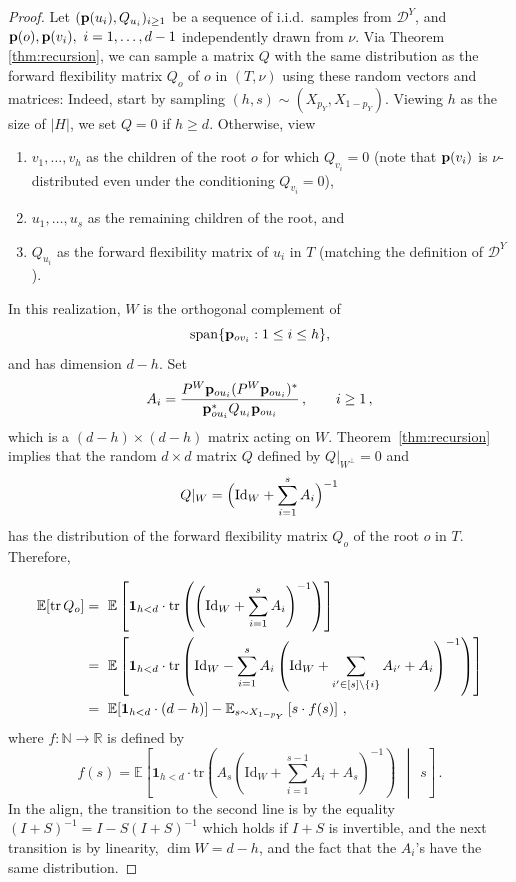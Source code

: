 \documentclass[reqno,english]{amsart}
\numberwithin{equation}{section}
\theoremstyle{definition}{
\newtheorem{example}[theorem]{Example}
\newtheorem{definition}[theorem]{Definition}
\newtheorem*{definition*}{Definition}
\newtheorem{problem}[theorem]{Problem}
\newtheorem{question}[theorem]{Question}
}
\newcommand{\E}{\mathbb E}
\newcommand{\N}{\mathbb N}
\newcommand{\R}{\mathbb R}
\newcommand{\cD}{\mathcal D}
\newcommand{\p}{{\bf p}}
\newcommand{\tr}{{\mathrm {tr}}}
\newcommand{\Id}{\mathrm{Id}}
\begin{document}
\begin{proof}
Let $(\p(u_i),Q_{u_i})_{i\ge 1}$ be a sequence of i.i.d.\ samples from $\cD^Y$, and $\p(o),\p(v_i),~i=1,\ldots,d-1$ independently drawn from $\nu$. Via Theorem \ref{thm:recursion}, we can sample a matrix $Q$ with the same distribution as the forward flexibility matrix $Q_o$ of $o$ in $(T,\nu)$
 using these random vectors and matrices: 
Indeed, start by sampling \((h,s)\sim (X_{p_Y},X_{1-p_Y})\).
Viewing \(h\) as the size of \(|H|\), we set \(Q=0\) if \(h\ge d\).
Otherwise, view
\begin{enumerate}
    \item[(i)] \(v_1,\ldots,v_h\) as the children of the root \(o\)
    for which \(Q_{v_i}=0\) (note that \(\p(v_i)\) is
    \(\nu\)-distributed even under the conditioning \(Q_{v_i}=0\)),
    \item[(ii)] \(u_1,\ldots,u_s\) as the remaining children of the root,
    and
    \item[(iii)] \(Q_{u_i}\) as the forward flexibility matrix of \(u_i\)
    in \(T\) (matching the definition of \(\cD^Y\)).
\end{enumerate}



In this realization, $W$ is the orthogonal complement of
\[
\mathrm{span}\{\p_{ov_i}: 1\le i\le h\},
\]
and has dimension $d-h$. Set 
\[
A_i=\frac{P^W\p_{ou_i}(P^W\p_{ou_i})^*}{\p_{ou_i}^*Q_{u_i}\p_{ou_i}}\,,\qquad i\ge 1\,,
\]
which is a $(d-h)\times(d-h)$ matrix acting on $W$. Theorem~\ref{thm:recursion} implies that the random $d\times d$ matrix $Q$ defined by $Q|_{W^\perp}=0$ and
\[
Q|_W=\Bigl(\Id_W+\sum_{i=1}^{s}A_i\Bigr)^{-1}
\]
has the distribution of the forward flexibility matrix $Q_o$ of the root $o$ in $T$.
Therefore,

\begin{align}
\notag 
\E[\tr\,Q_o] 
&=~ \E\left[ \mathbf 1_{h<d}\cdot \tr\left(\left(\Id_W + \sum_{i=1}^{s}A_i\right)^{-1}\right)\right] \\
\notag &=~ \E\left[\mathbf 1_{h<d}\cdot \tr\left(
\Id_W-\sum_{i=1}^{s}A_i \left(\Id_W + \sum_{i'\in[s]\setminus\{i\}}A_{i'} +A_i\right)^{-1}\right)\right] \\
\label{eq:first_stop} &=~ \E[\mathbf 1_{h<d}\cdot (d-h)] - \E_{s\sim X_{1-p_Y}}\left[ s\cdot f(s) \right]\,,
\end{align}
where $f:\N\to \R$ is defined by
\[
f(s) = 
\E\left[\mathbf{1}_{h<d}\cdot 
\tr\left(A_s \left(\Id_W + \sum_{i=1}^{s-1}A_i+A_s\right)^{-1}\right)
~~\middle |~~s\right]\,.
\]
In the align, the transition to the second line is by the equality $(I+S)^{-1}=I-S(I+S)^{-1}$ which holds if $I+S$ is invertible, and the next transition is by linearity, $\dim W=d-h$, and the fact that the $A_i$'s have the same distribution. 


\end{proof}
\end{document}
